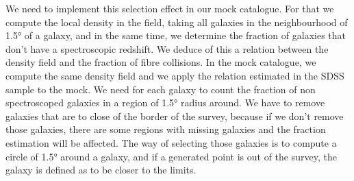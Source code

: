 We need to implement this selection effect in our mock catalogue. For that we
compute the local density in the field, taking all galaxies in the
neighbourhood of 1.5° of a galaxy, and in the same time, we determine the
fraction of galaxies that don't have a spectroscopic redshift. We deduce of
this a relation between the density field and the fraction of fibre collisions.
In the mock catalogue, we compute the same density field and we apply the
relation estimated in the SDSS sample to the mock. We need for
each galaxy to count the fraction of non spectroscoped galaxies in a region of
1.5° radius around. We have to remove galaxies that are to close of the
border of the survey, because if we don't remove those galaxies, there are some
regions with missing galaxies and the fraction estimation will be affected. The
way of selecting those galaxies is to compute a circle of 1.5° around a
galaxy, and if a generated point is out of the survey, the galaxy is defined as
to be closer to the limits.

